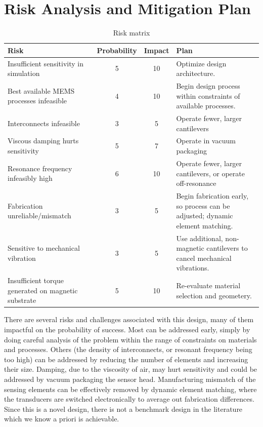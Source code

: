\section{Risk Analysis and Mitigation Plan}

\begin{table}[h!]
\centering
\begin{tabularx}{.85\textwidth}{|X||c|c|X|}
    \hline
    Risk & Probability & Impact & Plan\\
    \hline
    \hline
    Insufficient sensitivity in simulation & 5 & 10 & Optimize design architecture. \\
    \hline
    Best available MEMS processes infeasible & 4 & 10 & Begin design process within constraints of available processes. \\
    \hline
    Interconnects infeasible & 3 & 5 & Operate fewer, larger cantilevers \\
    \hline
    Viscous damping hurts sensitivity & 5 & 7 & Operate in vacuum packaging \\
    \hline
    Resonance frequency infeasibly high & 6  & 10 & Operate fewer, larger cantilevers, or operate off-resonance \\
    \hline
    Fabrication unreliable/mismatch & 3 & 5 & Begin fabrication early, so process can be adjusted; dynamic element matching. \\
    \hline
    Sensitive to mechanical vibration & 3 & 5 & Use additional, non-magnetic cantilevers to cancel mechanical vibrations. \\
    \hline
    Insufficient torque generated on magnetic substrate & 5 & 10 & Re-evaluate material selection and geometery. \\
    \hline
\end{tabularx}
\caption{Risk matrix}
\label{table:risk}
\end{table}

There are several risks and challenges associated with this design, many of them impactful on the probability of success. Most can be addressed early, simply by doing careful analysis of the problem within the range of constraints on materials and processes. Others (the density of interconnects, or resonant frequency being too high) can be addressed by reducing the number of elements and increasing their size. Damping, due to the viscosity of air, may hurt sensitivity and could be addressed by vacuum packaging the sensor head. Manufacturing mismatch of the sensing elements can be effectively removed by dynamic element matching, where the transducers are switched electronically to average out fabrication differences. Since this is a novel design, there is not a benchmark design in the literature which we know a priori is achievable.

